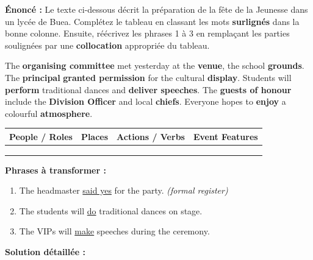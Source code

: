 \documentclass[11pt]{article}
\newcommand{\eng}[1]{\ifmmode\text{\textit{#1}}\else\begingroup\selectlanguage{english}\itshape #1\endgroup\fi}
\begin{document}
\begin{exoresolu}
\textbf{Énoncé :} Le texte ci-dessous décrit la préparation de la fête de la Jeunesse dans un lycée de Buea. Complétez le tableau en classant les mots \textbf{surlignés} dans la bonne colonne. Ensuite, réécrivez les phrases 1 à 3 en remplaçant les parties soulignées par une \textbf{collocation} appropriée du tableau.

\begin{textebox}
The \textbf{organising committee} met yesterday at the \textbf{venue}, the school \textbf{grounds}. The \textbf{principal} \textbf{granted permission} for the cultural \textbf{display}. Students will \textbf{perform} traditional dances and \textbf{deliver speeches}. The \textbf{guests of honour} include the \textbf{Division Officer} and local \textbf{chiefs}. Everyone hopes to \textbf{enjoy} a colourful \textbf{atmosphere}.
\end{textebox}

\begin{center}
\begin{tabularx}{\linewidth}{|X|X|X|X|}
\hline
\rowcolor{popblueL} \textbf{People / Roles} & \textbf{Places} & \textbf{Actions / Verbs} & \textbf{Event Features} \\ \hline
 &  &  &  \\ \hline
 &  &  &  \\ \hline
 &  &  &  \\ \hline
\end{tabularx}
\end{center}

\textbf{Phrases à transformer :}
\begin{enumerate}
    \item The headmaster \underline{said yes} for the party. \eng{(formal register)}
    \item The students will \underline{do} traditional dances on stage.
    \item The VIPs will \underline{make} speeches during the ceremony.
\end{enumerate}

\tcblower
\textbf{Solution détaillée :}


\end{exoresolu}
\end{document}
